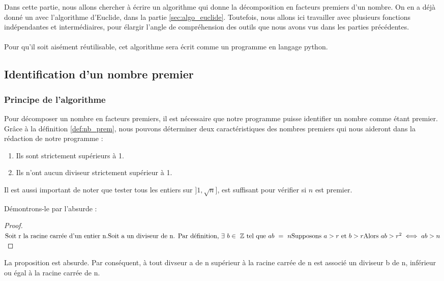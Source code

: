 Dans cette partie, nous allons chercher à écrire un algorithme qui donne la décomposition en facteurs premiers d'un nombre.
On en a déjà donné un avec l'algorithme d'Euclide, dans la partie \ref{sec:algo_euclide}. Toutefois, nous allons ici travailler avec plusieurs fonctions indépendantes et intermédiaires, pour élargir l'angle de compréhension des outils que nous avons vus dans les parties précédentes.\\
\\
    Pour qu'il soit aisément réutilisable, cet algorithme sera écrit comme
un programme en langage python.

\subsection{Identification d'un nombre premier}
\subsubsection{Principe de l'algorithme}

Pour décomposer un nombre en facteurs premiers, il est nécessaire que notre programme puisse identifier un nombre comme étant premier.
Grâce à la définition \ref{def:nb_prem},
nous pouvons déterminer deux caractéristiques des nombres premiers qui nous aideront dans la rédaction de notre programme :
\begin{enumerate}
    \item Ils sont strictement supérieurs à 1.
    \item Ils n'ont aucun diviseur strictement supérieur à 1.
\end{enumerate}

Il est aussi important de noter que tester tous les entiers sur $]1 , \sqrt{n}]$, est suffisant pour vérifier si $n$ est premier.

Démontrons-le par l'absurde :

\begin{proof}
\label{prf:inf_racine_suffit}
$
\text{Soit r la racine carrée d'un entier n.}\\
\text{Soit a un diviseur de n. Par définition,} \ \exists \ b \in \ \ens{Z} \ \text{tel que} \ ab \ = \ n\\
\text{Supposons} \ a > r \ \text{et} \ b > r\\
\text{Alors} \ ab > r^2 \iff ab > n
$
\end{proof}
La proposition est absurde.
Par conséquent, à tout divseur a de n supérieur à la racine carrée de n est associé un diviseur b de n, inférieur ou égal à la racine carrée de n.

